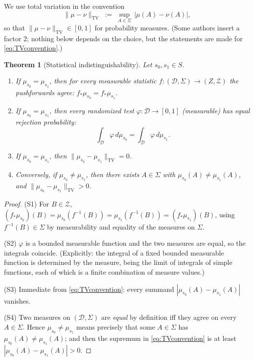 \documentclass[11pt,reqno]{amsart}
\theoremstyle{plain}
\newtheorem{theorem}{Theorem}[section]
\theoremstyle{definition}
\theoremstyle{remark}
\newcommand{\TV}{\mathrm{TV}}
\begin{document}
We use total variation in the convention
\begin{equation}\label{eq:TVconvention}
\|\mu-\nu\|_{\TV}\;:=\;\sup_{A\in\Sigma}\,|\mu(A)-\nu(A)| ,
\end{equation}
so that $\|\mu-\nu\|_{\TV}\in[0,1]$ for probability measures. (Some authors insert a factor $2$; nothing below depends on the choice, but the statements are made for \eqref{eq:TVconvention}.)

\begin{theorem}[Statistical indistinguishability]\label{thm:statistical}
Let $s_0,s_1\in S$.
\begin{enumerate}
\item[(S1)] If $\mu_{s_0}=\mu_{s_1}$, then for every measurable statistic $f\colon(\mathcal D,\Sigma)\to(Z,\mathcal Z)$ the pushforwards agree: $f_*\mu_{s_0}=f_*\mu_{s_1}$.
\item[(S2)] If $\mu_{s_0}=\mu_{s_1}$, then every randomized test $\varphi\colon\mathcal D\to[0,1]$ (measurable) has equal rejection probability:
\[
\int_{\mathcal D}\varphi\,d\mu_{s_0}=\int_{\mathcal D}\varphi\,d\mu_{s_1}.
\]
\item[(S3)] If $\mu_{s_0}=\mu_{s_1}$, then $\|\mu_{s_0}-\mu_{s_1}\|_{\TV}=0$.
\item[(S4)] Conversely, if $\mu_{s_0}\neq\mu_{s_1}$, then there exists $A\in\Sigma$ with $\mu_{s_0}(A)\neq\mu_{s_1}(A)$, and $\|\mu_{s_0}-\mu_{s_1}\|_{\TV}>0$.
\end{enumerate}
\end{theorem}

\begin{proof}
(S1) For $B\in\mathcal Z$, $(f_*\mu_{s_0})(B)=\mu_{s_0}(f^{-1}(B))=\mu_{s_1}(f^{-1}(B))=(f_*\mu_{s_1})(B)$, using $f^{-1}(B)\in\Sigma$ by measurability and equality of the measures on $\Sigma$.

(S2) $\varphi$ is a bounded measurable function and the two measures are equal, so the integrals coincide. (Explicitly: the integral of a fixed bounded measurable function is determined by the measure, being the limit of integrals of simple functions, each of which is a finite combination of measure values.)

(S3) Immediate from \eqref{eq:TVconvention}: every summand $|\mu_{s_0}(A)-\mu_{s_1}(A)|$ vanishes.

(S4) Two measures on $(\mathcal D,\Sigma)$ are \emph{equal} by definition iff they agree on every $A\in\Sigma$. Hence $\mu_{s_0}\neq\mu_{s_1}$ means precisely that some $A\in\Sigma$ has $\mu_{s_0}(A)\neq\mu_{s_1}(A)$; and then the supremum in \eqref{eq:TVconvention} is at least $|\mu_{s_0}(A)-\mu_{s_1}(A)|>0$.
\end{proof}
\end{document}
